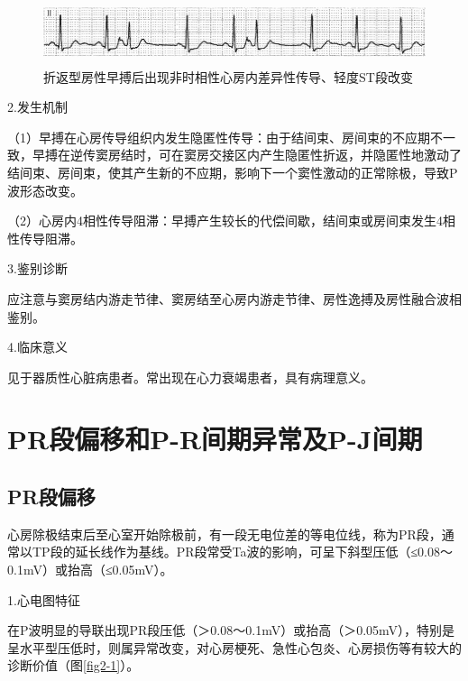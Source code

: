 \begin{figure}[!htbp]
 \centering
 \includegraphics[width=5.78125in,height=0.73958in]{./images/Image00035.jpg}
 \captionsetup{justification=centering}
 \caption{折返型房性早搏后出现非时相性心房内差异性传导、轻度ST段改变}
 \label{fig1-29}
  \end{figure} 

2.发生机制

（1）早搏在心房传导组织内发生隐匿性传导：由于结间束、房间束的不应期不一致，早搏在逆传窦房结时，可在窦房交接区内产生隐匿性折返，并隐匿性地激动了结间束、房间束，使其产生新的不应期，影响下一个窦性激动的正常除极，导致P波形态改变。

（2）心房内4相性传导阻滞：早搏产生较长的代偿间歇，结间束或房间束发生4相性传导阻滞。

3.鉴别诊断

应注意与窦房结内游走节律、窦房结至心房内游走节律、房性逸搏及房性融合波相鉴别。

4.临床意义

见于器质性心脏病患者。常出现在心力衰竭患者，具有病理意义。

\protect\hypertarget{text00008.html}{}{}

\protect\hypertarget{text00008.htmlux5cux23chapter8}{}{}

\chapter{PR段偏移和P-R间期异常及P-J间期}

\protect\hypertarget{text00008.htmlux5cux23subid28}{}{}

\section{PR段偏移}

心房除极结束后至心室开始除极前，有一段无电位差的等电位线，称为PR段，通常以TP段的延长线作为基线。PR段常受Ta波的影响，可呈下斜型压低（≤0.08～0.1mV）或抬高（≤0.05mV）。

1.心电图特征

在P波明显的导联出现PR段压低（＞0.08～0.1mV）或抬高（＞0.05mV），特别是呈水平型压低时，则属异常改变，对心房梗死、急性心包炎、心房损伤等有较大的诊断价值（图\ref{fig2-1}）。

